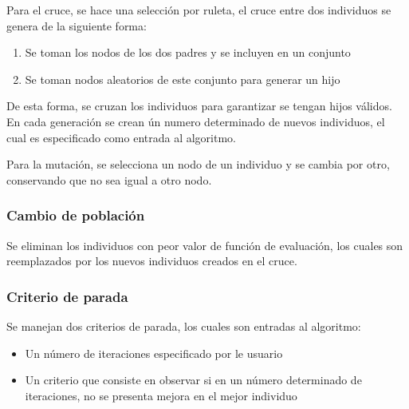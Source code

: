 Para el cruce, se hace una selección por ruleta\cite{9788497321839}, el cruce entre dos individuos se genera de la siguiente forma:

\begin{enumerate}
    \item Se toman los nodos de los dos padres y se incluyen en un conjunto
    \item Se toman nodos aleatorios de este conjunto para generar un hijo
\end{enumerate}

De esta forma, se cruzan los individuos para garantizar se tengan hijos válidos. En cada generación se crean ún numero determinado de nuevos individuos, el cual es especificado como entrada al algoritmo.

Para la mutación, se selecciona un nodo de un individuo y se cambia por otro, conservando que no sea igual a otro nodo.

\subsubsection{Cambio de población}

Se eliminan los individuos con peor valor de función de evaluación, los cuales son reemplazados por los nuevos individuos creados en el cruce.


\subsubsection{Criterio de parada}

Se manejan dos criterios de parada, los cuales son entradas al algoritmo:

\begin{itemize}
    \item Un número de iteraciones especificado por le usuario
    \item Un criterio que consiste en observar si en un número determinado de iteraciones, no se presenta mejora en el mejor individuo
\end{itemize}

